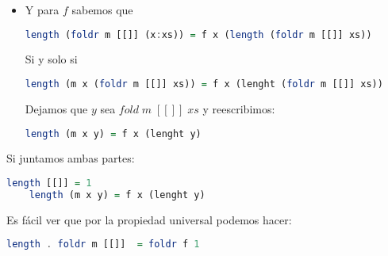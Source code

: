 \documentclass[spanish,12pt,letterpaper]{article}
\begin{document}
\begin{enumerate}
\begin{itemize}
    \item Y para $f$ sabemos que
    \begin{lstlisting}[language=Haskell]
    length (foldr m [[]] (x:xs)) = f x (length (foldr m [[]] xs))\end{lstlisting}
    Si y solo si
    \begin{lstlisting}[language=Haskell]
    length (m x (foldr m [[]] xs)) = f x (lenght (foldr m [[]] xs))\end{lstlisting}
	Dejamos que $y$ sea $fold\;m\;[[]]\;xs$ y reescribimos:
    \begin{lstlisting}[language=Haskell]
    length (m x y) = f x (lenght y)\end{lstlisting}
    \end{itemize}

    Si juntamos ambas partes:
	\begin{lstlisting}[language=Haskell]
    length [[]] = 1
    length (m x y) = f x (lenght y)\end{lstlisting}
    Es fácil ver que por la propiedad universal podemos hacer:
	\begin{lstlisting}[language=Haskell]
    length . foldr m [[]]  = foldr f 1\end{lstlisting}


\end{enumerate}
\end{document}
